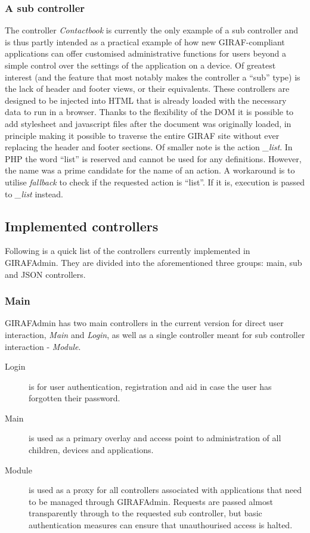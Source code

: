 \subsubsection*{A sub controller}
\label{controller_sub}


The controller \emph{Contactbook} is currently the only example of a sub controller and is thus partly intended as a practical example of how new GIRAF-compliant applications can offer customised administrative functions for users beyond a simple control over the settings of the application on a device.
Of greatest interest (and the feature that most notably makes the controller a ``sub'' type) is the lack of header and footer views, or their equivalents. These controllers are designed to be injected into HTML that is already loaded with the necessary data to run in a browser. Thanks to the flexibility of the DOM it is possible to add stylesheet and javascript files after the document was originally loaded, in principle making it possible to traverse the entire GIRAF site without ever replacing the header and footer sections.
Of smaller note is the action  \emph{\_list}. In PHP the word ``list'' is reserved and cannot be used for any definitions. However, the name was a prime candidate for the name of an action. A workaround is to utilise \emph{fallback} to check if the requested action is ``list''. If it is, execution is passed to \emph{\_list} instead.

\subsection{Implemented controllers}
Following is a quick list of the controllers currently implemented in GIRAFAdmin. They are divided into the aforementioned three groups: main, sub and JSON controllers.

\subsubsection*{Main}
GIRAFAdmin has two main controllers in the current version for direct user interaction, \emph{Main} and \emph{Login}, as well as a single controller meant for sub controller interaction - \emph{Module}.
\begin{description}
    \item[Login] is for user authentication, registration and aid in case the user has forgotten their password.
    \item[Main] is used as a primary overlay and access point to administration of all children, devices and applications.
    \item[Module] is used as a proxy for all controllers associated with applications that need to be managed through GIRAFAdmin. Requests are passed almost transparently through to the requested sub controller, but basic authentication measures can ensure that unauthourised access is halted.
\end{description}

